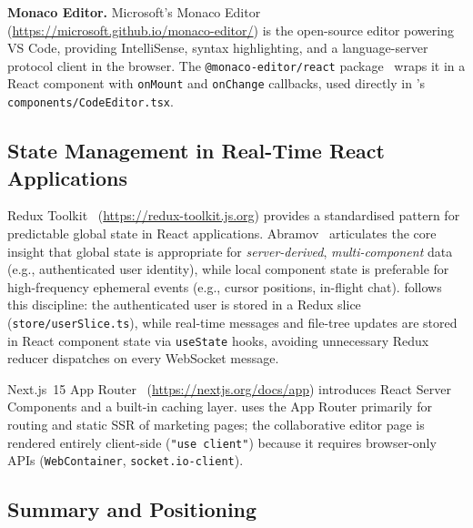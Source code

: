 \textbf{Monaco Editor.}
Microsoft's Monaco Editor~\cite{monaco2024}
(\url{https://microsoft.github.io/monaco-editor/}) is the open-source editor
powering VS Code, providing IntelliSense, syntax highlighting, and a
language-server protocol client in the browser. The \texttt{@monaco-editor/react}
package~\cite{monacoReact2024} wraps it in a React component with
\texttt{onMount} and \texttt{onChange} callbacks, used directly in \echoray{}'s
\texttt{components/CodeEditor.tsx}.

\subsection{State Management in Real-Time React Applications}
\label{sub:state_lit}

Redux Toolkit~\cite{reduxToolkit2024}
(\url{https://redux-toolkit.js.org}) provides a standardised pattern for
predictable global state in React applications. Abramov~\cite{abramov2024redux}
articulates the core insight that global state is appropriate for
\emph{server-derived}, \emph{multi-component} data (e.g., authenticated user
identity), while local component state is preferable for high-frequency
ephemeral events (e.g., cursor positions, in-flight chat). \echoray{} follows
this discipline: the authenticated user is stored in a Redux slice
(\texttt{store/userSlice.ts}), while real-time messages and file-tree updates
are stored in React component state via \texttt{useState} hooks, avoiding
unnecessary Redux reducer dispatches on every WebSocket message.

Next.js~15 App Router~\cite{nextjs2025}
(\url{https://nextjs.org/docs/app}) introduces React Server Components and a
built-in caching layer. \echoray{} uses the App Router primarily for routing
and static SSR of marketing pages; the collaborative editor page is rendered
entirely client-side (\texttt{"use client"}) because it requires browser-only
APIs (\texttt{WebContainer}, \texttt{socket.io-client}).

\subsection{Summary and Positioning}
\label{sub:litreview_summary}

